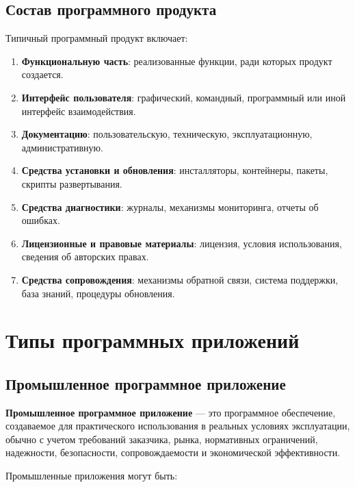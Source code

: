 \documentclass[12pt,a4paper]{article}
\begin{document}
\subsection{Состав программного продукта}

Типичный программный продукт включает:

\begin{enumerate}
    \item \textbf{Функциональную часть}: реализованные функции, ради которых продукт создается.

    \item \textbf{Интерфейс пользователя}: графический, командный, программный или иной интерфейс взаимодействия.

    \item \textbf{Документацию}: пользовательскую, техническую, эксплуатационную, административную.

    \item \textbf{Средства установки и обновления}: инсталляторы, контейнеры, пакеты, скрипты развертывания.

    \item \textbf{Средства диагностики}: журналы, механизмы мониторинга, отчеты об ошибках.

    \item \textbf{Лицензионные и правовые материалы}: лицензия, условия использования, сведения об авторских правах.

    \item \textbf{Средства сопровождения}: механизмы обратной связи, система поддержки, база знаний, процедуры обновления.
\end{enumerate}

\section{Типы программных приложений}

\subsection{Промышленное программное приложение}

\textbf{Промышленное программное приложение} --- это программное обеспечение, создаваемое для практического использования в реальных условиях эксплуатации, обычно с учетом требований заказчика, рынка, нормативных ограничений, надежности, безопасности, сопровождаемости и экономической эффективности.

Промышленные приложения могут быть:
\end{document}
